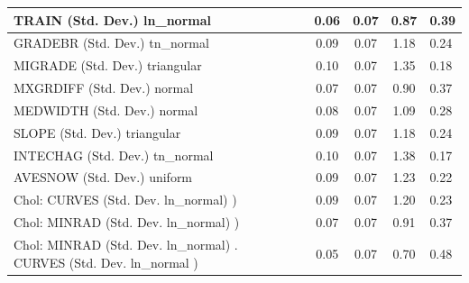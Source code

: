 \begin{table}
\begin{center}
\begin{tabular}{|l|l|c|c|c|l|}
			\hline
			TRAIN (Std. Dev.) ln_normal &  & 0.06 & 0.07 & 0.87 & 0.39 \\
			\hline
			GRADEBR (Std. Dev.) tn_normal &  & 0.09 & 0.07 & 1.18 & 0.24 \\
			\hline
			MIGRADE (Std. Dev.) triangular &  & 0.10 & 0.07 & 1.35 & 0.18 \\
			\hline
			MXGRDIFF (Std. Dev.) normal &  & 0.07 & 0.07 & 0.90 & 0.37 \\
			\hline
			MEDWIDTH (Std. Dev.) normal &  & 0.08 & 0.07 & 1.09 & 0.28 \\
			\hline
			SLOPE (Std. Dev.) triangular &  & 0.09 & 0.07 & 1.18 & 0.24 \\
			\hline
			INTECHAG (Std. Dev.) tn_normal &  & 0.10 & 0.07 & 1.38 & 0.17 \\
			\hline
			AVESNOW (Std. Dev.) uniform &  & 0.09 & 0.07 & 1.23 & 0.22 \\
			\hline
			 Chol: CURVES (Std. Dev. ln_normal) ) &  & 0.09 & 0.07 & 1.20 & 0.23 \\
			\hline
			 Chol: MINRAD (Std. Dev. ln_normal) ) &  & 0.07 & 0.07 & 0.91 & 0.37 \\
			\hline
			 Chol: MINRAD (Std. Dev. ln_normal) . CURVES (Std. Dev.   ln_normal ) &  & 0.05 & 0.07 & 0.70 & 0.48 \\
			\hline
		\end{tabular}
	\end{center}
\end{table}
